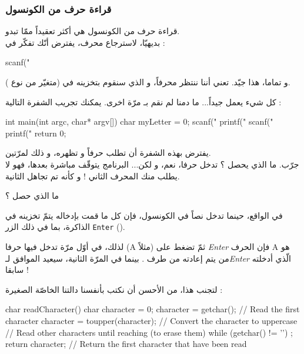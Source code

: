 \subsubsection{قراءة حرف من الكونسول}
قراءة حرف من الكونسول هي أكثر تعقيداً ممّا تبدو.\\
بديهيّا، لاسترجاع محرف، يفترض أنّك تفكّر في :

\begin{Csource}
scanf("%
\end{Csource}

و تماما، هذا جيّد.
تعني أننا ننتظر محرفاً، و الذي سنقوم بتخزينه في
(متغيّر من نوع
).


كل شيء يعمل جيداً... ما دمنا لم نقم بـ
مرّة اخرى. يمكنك تجريب الشفرة التالية :

\begin{Csource}
int main(int argc, char* argv[])
{
 	char myLetter = 0;
 	scanf("%
 	printf("%
 	scanf("%
 	printf("%
 	return 0;
}
\end{Csource}

يفترض بهذه الشفرة أن تطلب حرفاً و تظهره، و ذلك لمرّتين.\\
جرّب. ما الذي يحصل ؟ تدخل حرفا، نعم، و لكن... البرنامج يتوقّف مباشرة بعدها، فهو لا يطلب منك المحرف الثاني ! و كأنه تم تجاهل
الثانية.

\begin{question}
ما الذي حصل ؟
\end{question}

في الواقع، حينما تدخل نصاً في الكونسول، فإن كل ما قمت بإدخاله يتمّ تخزينه في الذاكرة، بما في ذلك الزر
\texttt{Enter}
().

لذلك، في أوّل مرّة تدخل فيها حرفا
(\textenglish{A}
مثلاً) ثمّ تضغط على
\textit{\textenglish{Enter}}
فإن الحرف
\textenglish{A}
هو من يتم إعادته من طرف
.
بينما في المرّة الثانية،
سيعيد
الموافق لـ\textit{\textenglish{Enter}}
الّذي أدخلته سابقا !

لتجنب هذا، من الأحسن أن نكتب بأنفسنا دالتنا الخاصّة الصغيرة
 :

\begin{Csource}
char readCharacter()
{
  char character = 0;
  character = getchar(); // Read the first character
  character = toupper(character); // Convert the character to uppercase
  // Read other characters until reaching \n (to erase them)
  while (getchar() != '\n') ;
  return character; // Return the first character that have been read
}
\end{Csource}

